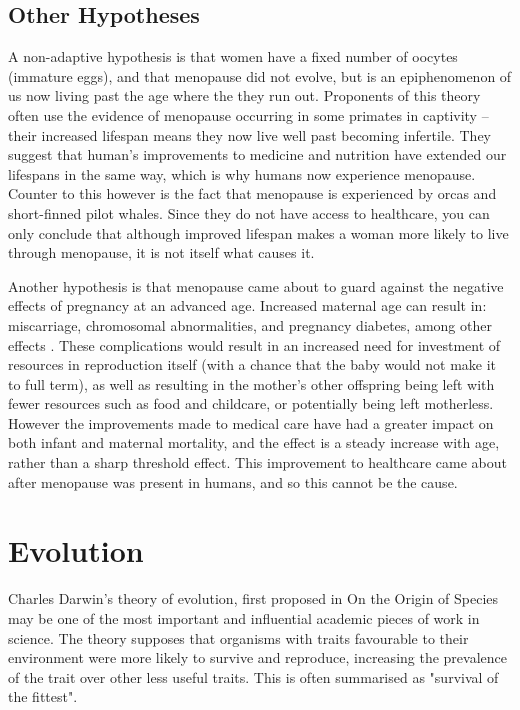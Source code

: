\documentclass[authoryearcitations]{UoYCSproject}
\begin{document}
\subsection{Other Hypotheses}
A non-adaptive hypothesis is that women have a fixed number of oocytes (immature eggs), and that menopause did not evolve, but is an epiphenomenon of us now living past the age where the they run out. \cite{van2003ovarian, cooper1998age} Proponents of this theory often use the evidence of menopause occurring in some primates in captivity -- their increased lifespan means they now live well past becoming infertile. They suggest that human's improvements to medicine and nutrition have extended our lifespans in the same way, which is why humans now experience menopause. Counter to this however is the fact that menopause is experienced by orcas and short-finned pilot whales. Since they do not have access to healthcare, you can only conclude that although improved lifespan makes a woman more likely to live through menopause, it is not itself what causes it.

Another hypothesis is that menopause came about to guard against the negative effects of pregnancy at an advanced age. Increased maternal age can result in: miscarriage, chromosomal abnormalities, and pregnancy diabetes, among other effects \cite{cleary2005impact}. These complications would result in an increased need for investment of resources in reproduction itself (with a chance that the baby would not make it to full term), as well as resulting in the mother's other offspring being left with fewer resources such as food and childcare, or potentially being left motherless. However the improvements made to medical care have had a greater impact on both infant and maternal mortality, and the effect is a steady increase with age, rather than a sharp threshold effect. This improvement to healthcare came about after menopause was present in humans, and so this cannot be the cause.

\section{Evolution}
Charles Darwin's theory of evolution, first proposed in On the Origin of Species \cite{origin1859} may be one of the most important and influential academic pieces of work in science. The theory supposes that organisms with traits favourable to their environment were more likely to survive and reproduce, increasing the prevalence of the trait over other less useful traits. This is often summarised as "survival of the fittest".
\end{document}
